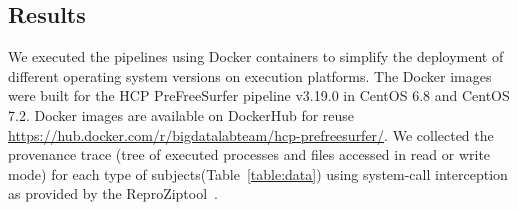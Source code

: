 \documentclass[a4paper,num-refs]{oup-contemporary}
\newcommand{\reprozip}[0]{ReproZip}
\begin{document}
%



\subsection{Results}

We executed the pipelines using Docker containers to simplify the 
deployment of different operating system versions on execution 
platforms. The Docker images were built for the HCP PreFreeSurfer 
pipeline v3.19.0 in 
CentOS 6.8 and CentOS 7.2. Docker images are available on DockerHub for 
reuse \url{https://hub.docker.com/r/bigdatalabteam/hcp-prefreesurfer/}. 
We collected the provenance trace (tree of executed processes and files 
accessed in read or write mode) for each type of 
subjects(Table~\ref{table:data}) using system-call interception as 
provided by the \reprozip tool~\cite{Chirigati2016}.
\end{document}
